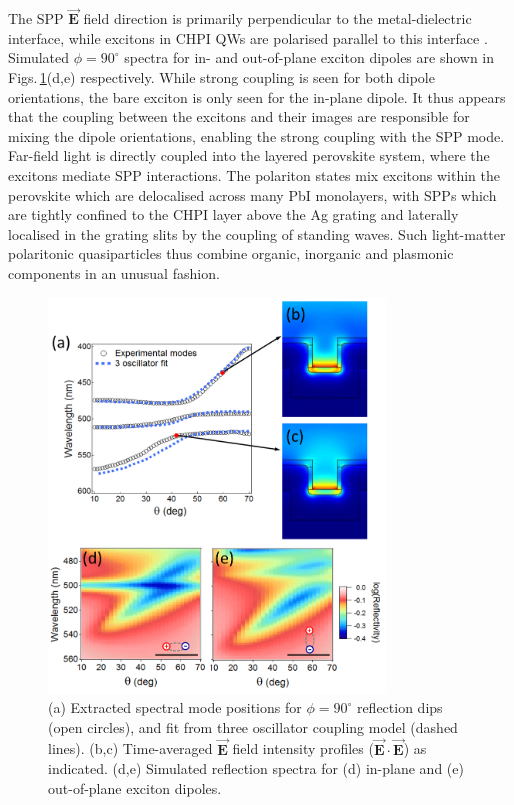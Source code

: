 The SPP $\vec{\mathbf{E}}$ field direction is primarily perpendicular to the metal-dielectric interface, while excitons in CHPI QWs are polarised parallel to this interface \cite{Pradeesh2009b, Mitzi2001b}.  Simulated $\phi=90^{\circ}$ spectra for in- and out-of-plane exciton dipoles are shown in Figs.\,\ref{7Fig18}(d,e) respectively. While strong coupling is seen for both dipole orientations, the bare exciton is only seen for the in-plane dipole. It thus appears that the coupling between the excitons and their images are responsible for mixing the dipole orientations, enabling the strong coupling with the SPP mode. Far-field light is directly coupled into the layered perovskite system, where the excitons mediate SPP interactions. The polariton states mix excitons within the perovskite which are delocalised across many PbI monolayers, with SPPs which are tightly confined to the CHPI layer above the Ag grating and laterally localised in the grating slits by the coupling of standing waves. Such light-matter polaritonic quasiparticles thus combine organic, inorganic and plasmonic components in an unusual fashion.
\begin{figure}[h!] 
\centering    
\includegraphics[width=0.8\textwidth]{Fig18}
\caption{(a) Extracted spectral mode positions for $\phi=90^{\circ}$ reflection dips (open circles), and fit from three oscillator coupling model (dashed lines). (b,c) Time-averaged $\vec{\mathbf{E}}$ field intensity profiles ($\vec{\mathbf{E}}\cdot\vec{\mathbf{E}}$) as indicated. (d,e) Simulated reflection spectra for (d) in-plane and (e) out-of-plane exciton dipoles.}
\label{7Fig18}
\end{figure}

